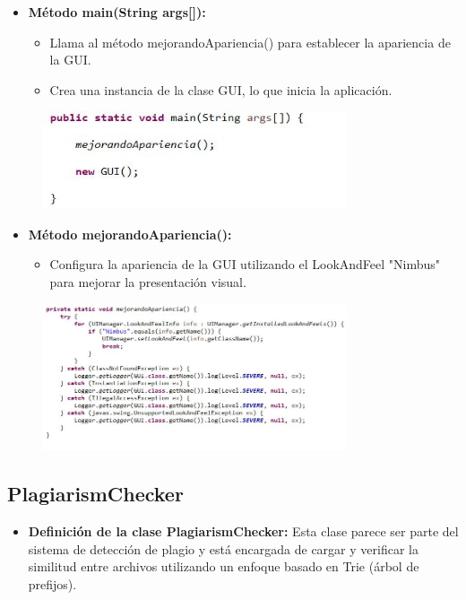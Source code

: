 \documentclass{article}
\begin{document}
	\begin{itemize}
	\item \textbf{Método main(String args[]):}
	 \begin{itemize}
	 \item Llama al método mejorandoApariencia() para establecer la apariencia de la GUI.
	 \item Crea una instancia de la clase GUI, lo que inicia la aplicación.
	 \end{itemize}
	\end{itemize}
	 \begin{figure}[H]
		\centering
		\includegraphics[width=0.8\textwidth,keepaspectratio]{img/GUI9.jpg}
	\end{figure}
	
	\begin{itemize}
	\item \textbf{Método mejorandoApariencia():}
	 \begin{itemize}
	 \item Configura la apariencia de la GUI utilizando el LookAndFeel "Nimbus" para mejorar la presentación visual.
	 \end{itemize}
	\end{itemize}
	 \begin{figure}[H]
		\centering
		\includegraphics[width=0.8\textwidth,keepaspectratio]{img/GUI10.jpg}
	\end{figure}
\clearpage	
	
	 \subsection{PlagiarismChecker}
	 \begin{itemize}
	\item \textbf{Definición de la clase PlagiarismChecker:} Esta clase parece ser parte del sistema de detección de plagio y está encargada de cargar y verificar la similitud entre archivos utilizando un enfoque basado en Trie (árbol de prefijos).
	\end{itemize}
	
\end{document}
